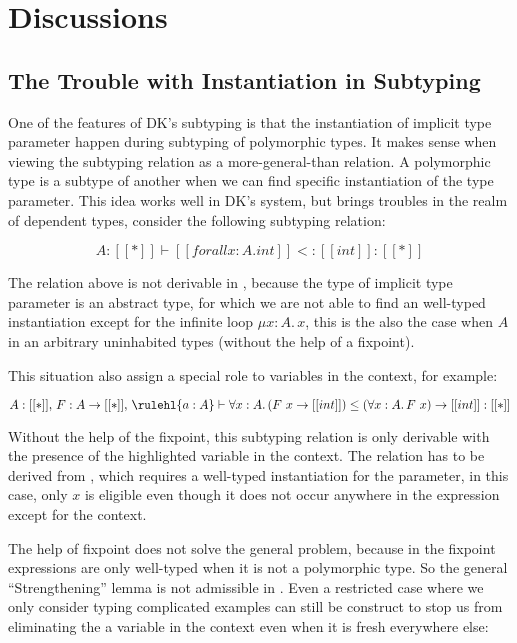 \section{Discussions}

\subsection{The Trouble with Instantiation in Subtyping}
\label{sec:instantiation}

One of the features of DK's subtyping is that the instantiation of implicit type
parameter happen during subtyping of polymorphic types. It makes sense when
viewing the subtyping relation as a more-general-than relation. A polymorphic
type is a subtype of another when we can find specific instantiation of the
type parameter. This idea works well in DK's system, but brings troubles
in the realm of dependent types, consider the following subtyping relation:

\begin{equation*}
    A : [[*]] \vdash [[forall x : A. int]] <: [[int]] : [[*]]
\end{equation*}

The relation above is not derivable in \name, because the type of implicit type
parameter is an abstract type, for which we are not able to find an well-typed
instantiation except for the infinite loop $\mu x : A.\, x$, this is the also the
case when $A$ in an arbitrary uninhabited types (without the help of a fixpoint).

This situation also assign a special role to variables in the context,
for example:

\begin{equation*}
    A : [[*]],\, F : A \rightarrow [[*]],\, \rulehl{a : A} \vdash
    \forall x : A.\, (F~x \rightarrow [[int]]) \le (\forall x : A.\, F~x) \rightarrow [[int]] : [[*]]
\end{equation*}

Without the help of the fixpoint, this subtyping relation is only derivable
with the presence of the highlighted variable in the context. The relation has to
be derived from , which requires a well-typed instantiation for
the parameter, in this case, only $x$ is eligible even though it does not occur
anywhere in the expression except for the context.

The help of fixpoint does not solve the general problem, because
in \name the fixpoint expressions are only well-typed when it is not a polymorphic
type. So the general ``Strengthening'' lemma is not admissible in \name. Even
a restricted case where we only consider typing complicated examples can still
be construct to stop us from eliminating the a variable in the context even
when it is fresh everywhere else:

